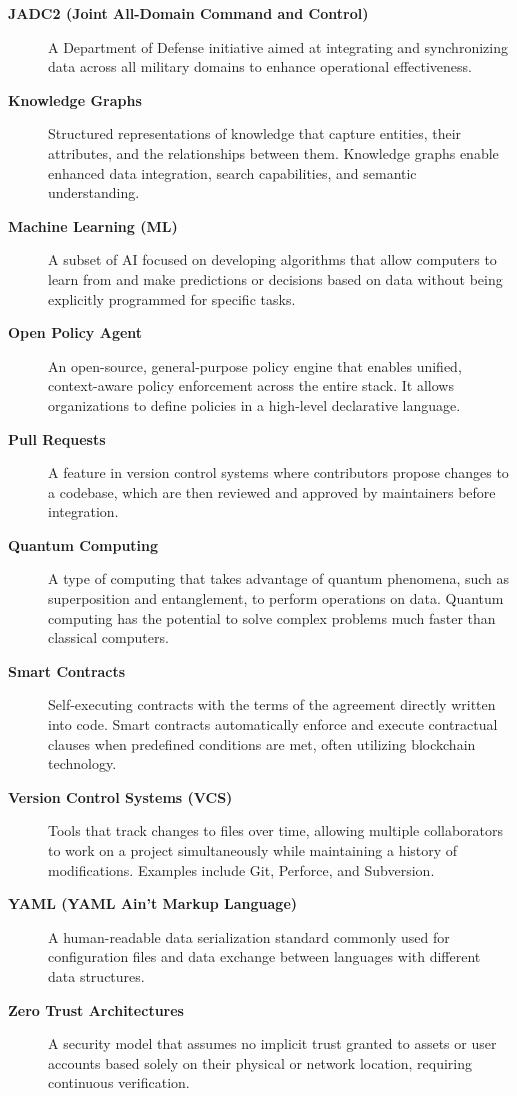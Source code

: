 \documentclass[11pt]{article}
\begin{document}
\begin{description}
    \item[\textbf{JADC2 (Joint All-Domain Command and Control)}]
    A Department of Defense initiative aimed at integrating and synchronizing data across all military domains to enhance operational effectiveness.

    \item[\textbf{Knowledge Graphs}]
    Structured representations of knowledge that capture entities, their attributes, and the relationships between them. Knowledge graphs enable enhanced data integration, search capabilities, and semantic understanding.

    \item[\textbf{Machine Learning (ML)}]
    A subset of AI focused on developing algorithms that allow computers to learn from and make predictions or decisions based on data without being explicitly programmed for specific tasks.

    \item[\textbf{Open Policy Agent}]
    An open-source, general-purpose policy engine that enables unified, context-aware policy enforcement across the entire stack. It allows organizations to define policies in a high-level declarative language.

    \item[\textbf{Pull Requests}]
    A feature in version control systems where contributors propose changes to a codebase, which are then reviewed and approved by maintainers before integration.

    \item[\textbf{Quantum Computing}]
    A type of computing that takes advantage of quantum phenomena, such as superposition and entanglement, to perform operations on data. Quantum computing has the potential to solve complex problems much faster than classical computers.

    \item[\textbf{Smart Contracts}]
    Self-executing contracts with the terms of the agreement directly written into code. Smart contracts automatically enforce and execute contractual clauses when predefined conditions are met, often utilizing blockchain technology.

    \item[\textbf{Version Control Systems (VCS)}]
    Tools that track changes to files over time, allowing multiple collaborators to work on a project simultaneously while maintaining a history of modifications. Examples include Git, Perforce, and Subversion.

    \item[\textbf{YAML (YAML Ain't Markup Language)}]
    A human-readable data serialization standard commonly used for configuration files and data exchange between languages with different data structures.

    \item[\textbf{Zero Trust Architectures}]
    A security model that assumes no implicit trust granted to assets or user accounts based solely on their physical or network location, requiring continuous verification.

\end{description}
\end{document}
